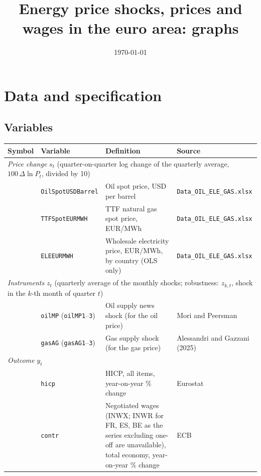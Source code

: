 \documentclass[11pt,a4paper]{article}
\title{Energy price shocks, prices and wages in the euro area: graphs}
\date{\today}
\begin{document}
\maketitle
\tableofcontents
\clearpage

\section{Data and specification}

\subsection{Variables}

\begin{table}[H]
\centering
\footnotesize
\begin{tabular}{llp{6.2cm}l}
\toprule
Symbol & Variable & Definition & Source \\
\midrule
\multicolumn{4}{l}{\emph{Price change} $s_{t}$ (quarter-on-quarter log change of the quarterly average, $100\,\Delta\ln P_t$, divided by 10)} \\
 & \texttt{OilSpotUSDBarrel} & Oil spot price, USD per barrel & \texttt{Data\_OIL\_ELE\_GAS.xlsx} \\
 & \texttt{TTFSpotEURMWH} & TTF natural gas spot price, EUR/MWh & \texttt{Data\_OIL\_ELE\_GAS.xlsx} \\
 & \texttt{ELEEURMWH} & Wholesale electricity price, EUR/MWh, by country (OLS only) & \texttt{Data\_OIL\_ELE\_GAS.xlsx} \\
\midrule
\multicolumn{4}{l}{\emph{Instruments} $z_{t}$ (quarterly average of the monthly shocks; robustness: $z_{k,t}$, shock in the $k$-th month of quarter $t$)} \\
 & \texttt{oilMP} (\texttt{oilMP1}--\texttt{3}) & Oil supply news shock (for the oil price) & Mori and Peersman \\
 & \texttt{gasAG} (\texttt{gasAG1}--\texttt{3}) & Gas supply shock (for the gas price) & Alessandri and Gazzani (2025) \\
\midrule
\multicolumn{4}{l}{\emph{Outcome} $y_{t}$} \\
 & \texttt{hicp} & HICP, all items, year-on-year \% change & Eurostat \\
 & \texttt{contr} & Negotiated wages (INWX; INWR for FR, ES, BE as the series excluding one-off are unavailable), total economy, year-on-year \% change & ECB \\

\end{tabular}
\end{table}
\end{document}
